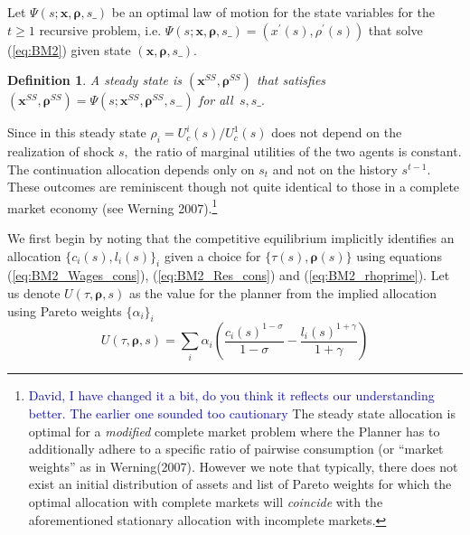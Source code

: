 \documentclass[thmsb,11pt]{article}
\newtheorem{definition}{Definition}
\begin{document}
Let $\Psi \left( s;\mathbf{x},\mathbf{\rho },s\_\right) $ be an optimal  law of motion for the state variables
for the $t\geq1$ recursive problem, i.e. $\Psi \left( s;\mathbf{x},%
\mathbf{\rho },s\_\right) =\left( x^{\prime }\left( s\right) ,\rho ^{\prime
}\left( s\right) \right) $ that solve (\ref{eq:BM2}) given state $\left(
\mathbf{x},\mathbf{\rho },s\_\right) .$ 
\begin{definition}
 A steady state is $\left( \bm{x}^{SS},\bm{\rho} ^{SS}\right) $ that satisfies $\left(\bm{ x}^{SS},\bm{\rho}
^{SS}\right) =\Psi \left( s;\bm{x}^{SS},\bm{\rho} ^{SS},s_{-}\right) $ for all $%
\,s,s\_.$ 
\end{definition}
Since in this steady state $\rho_i =U_{c}^{i}(s)/U_{c}^{1}(s)$ does
not depend on the realization of shock $s,$ the ratio of marginal utilities
of the two agents is constant. The continuation allocation depends only on  $s_{t}$ and not on the  history $s^{t-1}$. These outcomes are reminiscent though not quite identical to those in a complete market economy (see Werning
2007).\footnote{\textcolor{blue}{David, I have changed it a bit, do you think it reflects our understanding better. The earlier one sounded too cautionary}
The steady state allocation is optimal for a \emph{modified} complete market problem where the Planner has to additionally adhere to a specific ratio of pairwise consumption (or ``market weights'' as in Werning(2007). However we note that typically, there does not exist an initial distribution of  assets  and list of Pareto weights for which the optimal allocation with complete markets will \emph{coincide} with the aforementioned stationary allocation with incomplete markets.}

We first begin by noting that the competitive equilibrium implicitly identifies an allocation $\{c_i(s),l_i(s)\}_{i}$ given a choice for $\{\tau(s), \bm{\rho}(s)\}$ using equations (\ref{eq:BM2_Wages_cons}), (\ref{eq:BM2_Res_cons}) and (\ref{eq:BM2_rhoprime}).  Let us denote $U(\tau,\bm{\rho},s)$ as the value for the planner from the implied allocation using Pareto weights $\{\alpha_i\}_i$ 
\[U(\tau,\bm{\rho},s)=\sum_{i}\alpha_i \left(\frac{c_i(s)^{1-\sigma}}{1-\sigma}-\frac{l_i(s)^{1+\gamma}}{1+\gamma}\right)\]
\end{document}
